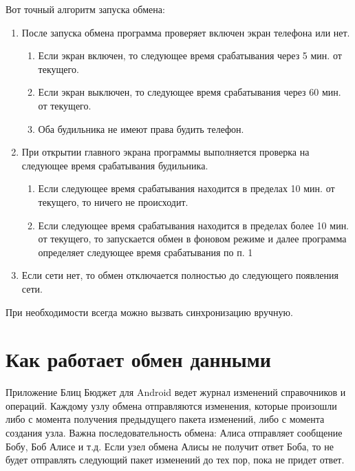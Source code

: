 \documentclass[a4paper,10pt,russian]{sphinxmanual}
\begin{document}
\sphinxAtStartPar
Вот точный алгоритм запуска обмена:
\begin{enumerate}
%
\item {} 
\sphinxAtStartPar
После запуска обмена программа проверяет включен экран телефона или нет.
\begin{enumerate}
%
\item {} 
\sphinxAtStartPar
Если экран включен, то следующее время срабатывания \sphinxhyphen{} через 5 мин. от текущего.

\item {} 
\sphinxAtStartPar
Если экран выключен, то следующее время срабатывания \sphinxhyphen{} через 60 мин. от текущего.

\item {} 
\sphinxAtStartPar
Оба будильника не имеют права будить телефон.

\end{enumerate}

\item {} 
\sphinxAtStartPar
При открытии главного экрана программы выполняется проверка на следующее время срабатывания будильника.
\begin{enumerate}
%
\item {} 
\sphinxAtStartPar
Если следующее время срабатывания находится в пределах 10 мин. от текущего, то ничего не происходит.

\item {} 
\sphinxAtStartPar
Если следующее время срабатывания находится в пределах более 10 мин. от текущего, то запускается обмен в фоновом режиме и далее программа определяет следующее время срабатывания по п. 1

\end{enumerate}

\item {} 
\sphinxAtStartPar
Если сети нет, то обмен отключается полностью до следующего появления сети.

\end{enumerate}

\sphinxAtStartPar
При необходимости всегда можно вызвать синхронизацию вручную.


\section{Как работает обмен данными}
\label{\detokenize{teamwork:id7}}
\sphinxAtStartPar
Приложение Блиц Бюджет для Android ведет журнал изменений справочников и операций. Каждому узлу обмена отправляются изменения,
которые произошли либо с момента получения предыдущего пакета изменений, либо с момента создания узла.
Важна последовательность обмена: Алиса отправляет сообщение Бобу, Боб \sphinxhyphen{} Алисе и т.д. Если узел обмена Алисы не
получит ответ Боба, то не будет отправлять следующий пакет изменений до тех пор, пока не придет ответ.
\end{document}

